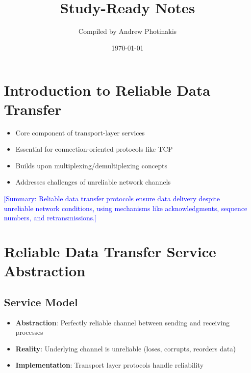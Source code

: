 \documentclass[12pt]{article}
\title{\TOPICTITLE\\\large Study-Ready Notes}
\author{Compiled by Andrew Photinakis}
\date{\today}
\begin{document}
\maketitle
\tableofcontents
\newpage


\section{Introduction to Reliable Data Transfer}

\begin{itemize}
    \item Core component of transport-layer services
    \item Essential for connection-oriented protocols like TCP
    \item Builds upon multiplexing/demultiplexing concepts
    \item Addresses challenges of unreliable network channels
\end{itemize}

\textcolor{blue}{[Summary: Reliable data transfer protocols ensure data delivery despite unreliable network conditions, using mechanisms like acknowledgments, sequence numbers, and retransmissions.]}

\section{Reliable Data Transfer Service Abstraction}

\subsection{Service Model}
\begin{itemize}
    \item \textbf{Abstraction}: Perfectly reliable channel between sending and receiving processes
    \item \textbf{Reality}: Underlying channel is unreliable (loses, corrupts, reorders data)
    \item \textbf{Implementation}: Transport layer protocols handle reliability
\end{itemize}
\end{document}
